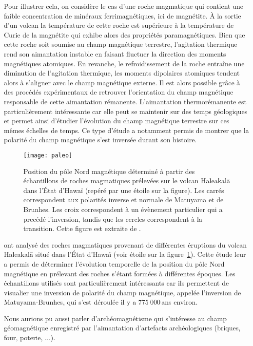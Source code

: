 Pour illustrer cela, on considère le cas d'une roche magmatique qui contient une
faible concentration de minéraux ferrimagnétiques, ici de magnétite. 
À la sortie d'un volcan la température de cette roche est supérieure à la température
de Curie de la magnétite qui exhibe alors des propriétés paramagnétiques. 
Bien que cette roche soit soumise au champ magnétique terrestre, l'agitation thermique
rend son aimantation instable en faisant fluctuer la direction des moments magnétiques
atomiques. En revanche, le refroidissement de la roche entraîne une diminution de
l'agitation thermique, les moments dipolaires atomiques tendent alors à s'aligner
avec le champ magnétique externe. Il est alors possible grâce à des procédés 
expérimentaux de retrouver l'orientation du champ magnétique responsable de cette
aimantation rémanente. L'aimantation thermorémanente est particulièrement 
intéressante car elle peut se maintenir sur des temps géologiques et permet
ainsi d'étudier l'évolution du champ magnétique terrestre sur ces mêmes échelles de temps.
Ce type d'étude a notamment permis de montrer que la polarité du champ magnétique 
s'est inversée durant son histoire.

\begin{figure}[h]
	\centering
	\texttt{[image: paleo]}
	\caption{Position du pôle Nord magnétique déterminé à partir des
	échantillons de roches magmatiques prélevées sur le volcan Haleakal\=a
	dans l'État d'Hawaï (repéré par une étoile sur la figure). Les carrés
	correspondent aux polarités inverse et normale de Matuyama et de Brunhes. Les
	croix correspondent à un évènement particulier qui a precédé l'inversion, tandis que
	les cercles correspondent à la transition. Cette figure est extraite de 
	\cite{Coe2000}.}%
	\label{fig:paleo}
\end{figure}

\begin{exemple}
	\cite{Coe2000} ont analysé des roches magmatiques provenant de 
	différentes éruptions du volcan Haleakal\=a situé dans l'État d'Hawaï
	(voir étoile sur la figure~\ref{fig:paleo}). Cette étude leur a permis 
	de déterminer
	l'évolution temporelle de la position du pôle Nord magnétique en prélevant des
	roches s'étant formées à différentes époques. Les échantillons utilisés sont
	particulièrement intéressants car ils permettent de visualier une inversion
	de polarité du champ magnétique, appelée l'inversion de Matuyama-Brunhes, 
	qui s'est déroulée il y a $775\ 000$\,ans environ.
\end{exemple}


\begin{rema}
	Nous aurions pu aussi parler d'archéomagnétisme \citep[voir][]{Gallet2009}
	qui s'intéresse au
	champ géomagnétique enregistré par l'aimantation d'artefacts archéologiques
	(briques, four, poterie, ...).
\end{rema}
